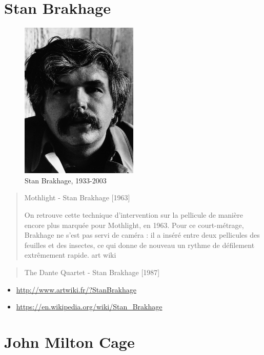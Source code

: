 \documentclass[
  french,
]{book}
\providecommand{\tightlist}{%
  \setlength{\itemsep}{0pt}\setlength{\parskip}{0pt}}
\begin{document}
\hypertarget{stan-brakhage}{%
\section{Stan Brakhage}\label{stan-brakhage}}

\begin{figure}
\centering
\includegraphics[width=0.5\textwidth,height=\textheight]{medias/corpus/brakhage/Stan_Brakhage_(circa_1976).jpg}
\caption{Stan Brakhage, 1933-2003}
\end{figure}

\begin{quote}
Mothlight - Stan Brakhage {[}1963{]}

On retrouve cette technique d'intervention sur la pellicule de manière encore plus marquée pour Mothlight, en 1963. Pour ce court-métrage, Brakhage ne s'est pas servi de caméra : il a inséré entre deux pellicules des feuilles et des insectes, ce qui donne de nouveau un rythme de défilement extrêmement rapide.
art wiki
\end{quote}

\begin{quote}
The Dante Quartet - Stan Brakhage {[}1987{]}
\end{quote}

\begin{itemize}
\tightlist
\item
  \url{http://www.artwiki.fr/?StanBrakhage}
\item
  \url{https://en.wikipedia.org/wiki/Stan_Brakhage}
\end{itemize}

\hypertarget{john-milton-cage}{%
\section{John Milton Cage}\label{john-milton-cage}}
\end{document}
